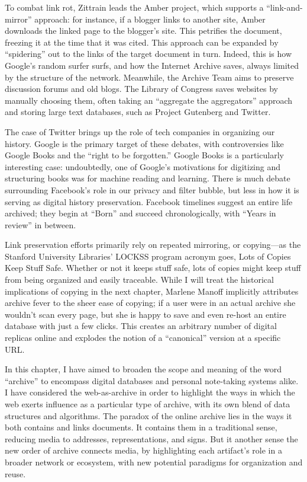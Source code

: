 To combat link rot, Zittrain leads the Amber project, which supports a ``link-and-mirror'' approach: for instance, if a blogger links to another site, Amber downloads the linked page to the blogger's site. This petrifies the document, freezing it at the time that it was cited. This approach can be expanded by ``spidering'' out to the links of the target document in turn. Indeed, this is how Google's random surfer surfs, and how the Internet Archive saves, always limited by the structure of the network. Meanwhile, the Archive Team aims to preserve discussion forums and old blogs. The Library of Congress saves websites by manually choosing them, often taking an ``aggregate the aggregators'' approach and storing large text databases, such as Project Gutenberg and Twitter.

The case of Twitter brings up the role of tech companies in organizing our history. Google is the primary target of these debates, with controversies like Google Books and the ``right to be forgotten.'' Google Books is a particularly interesting case: undoubtedly, one of Google's motivations for digitizing and structuring books was for machine reading and learning. There is much debate surrounding Facebook's role in our privacy and filter bubble, but less in how it is serving as digital history preservation. Facebook timelines suggest an entire life archived; they begin at ``Born'' and succeed chronologically, with ``Years in review'' in between.

Link preservation efforts primarily rely on repeated mirroring, or copying---as the Stanford University Libraries' LOCKSS program acronym goes, Lots of Copies Keep Stuff Safe. Whether or not it keeps stuff safe, lots of copies might keep stuff from being organized and easily traceable. While I will treat the historical implications of copying in the next chapter, Marlene Manoff implicitly attributes archive fever to the sheer ease of copying; if a user were in an actual archive she wouldn’t scan every page, but she is happy to save and even re-host an entire database with just a few clicks. This creates an arbitrary number of digital replicas online and explodes the notion of a ``canonical'' version at a specific URL.


In this chapter, I have aimed to broaden the scope and meaning of the word ``archive'' to encompass digital databases and personal note-taking systems alike. I have considered the web-as-archive in order to highlight the ways in which the web exerts influence as a particular type of archive, with its own blend of data structures and algorithms. The paradox of the online archive lies in the ways it both contains and links documents. It contains them in a traditional sense, reducing media to addresses, representations, and signs. But it another sense the new order of archive connects media, by highlighting each artifact's role in a broader network or ecosystem, with new potential paradigms for organization and reuse.
